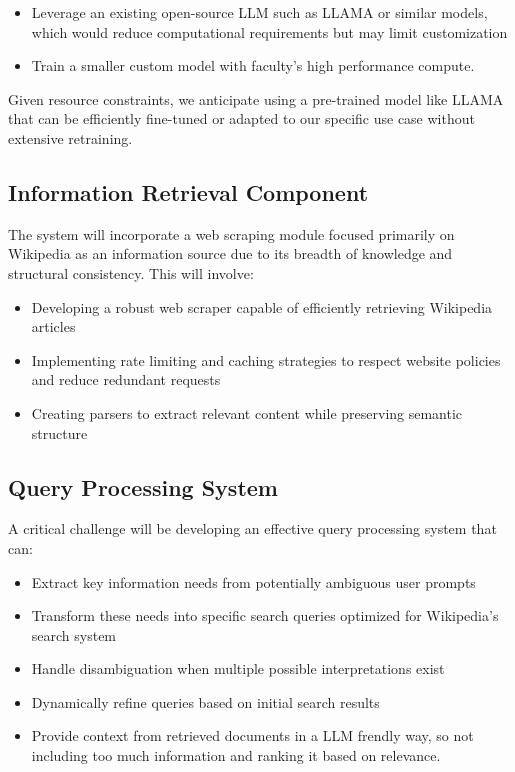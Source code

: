 \documentclass[fleqn,moreauthors,10pt]{ds_report}
\begin{document}
\begin{itemize}[itemsep=0em]
\item Leverage an existing open-source LLM such as LLAMA or similar models, which would reduce computational requirements but may limit customization
\item Train a smaller custom model with faculty's high performance compute.
\end{itemize}
Given resource constraints, we anticipate using a pre-trained model like LLAMA that can be efficiently fine-tuned or adapted to our specific use case without extensive retraining.

\subsection*{Information Retrieval Component}
The system will incorporate a web scraping module focused primarily on Wikipedia as an information source due to its breadth of knowledge and structural consistency. This will involve:

\begin{itemize}[itemsep=0em]
\item Developing a robust web scraper capable of efficiently retrieving Wikipedia articles
\item Implementing rate limiting and caching strategies to respect website policies and reduce redundant requests
\item Creating parsers to extract relevant content while preserving semantic structure
\end{itemize}

\subsection*{Query Processing System}
A critical challenge will be developing an effective query processing system that can:

\begin{itemize}[itemsep=0em]
\item Extract key information needs from potentially ambiguous user prompts
\item Transform these needs into specific search queries optimized for Wikipedia's search system
\item Handle disambiguation when multiple possible interpretations exist
\item Dynamically refine queries based on initial search results
\item Provide context from retrieved documents in a LLM frendly way, so not including too much information and ranking it based on relevance.
\end{itemize}
\end{document}
